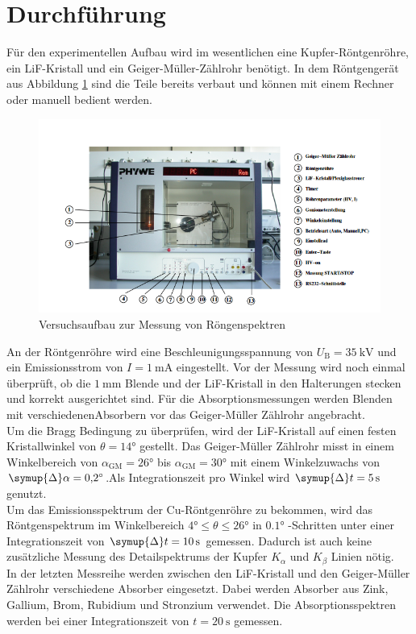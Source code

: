 \section{Durchführung}
Für den experimentellen Aufbau wird im wesentlichen eine Kupfer-Röntgenröhre, ein LiF-Kristall und ein Geiger-Müller-Zählrohr benötigt. In dem Röntgengerät aus Abbildung \ref{fig:aufbau}
sind die Teile bereits verbaut und können mit einem Rechner oder manuell bedient werden.
\begin{figure}
    \centering
    \caption{Versuchsaufbau zur Messung von Röngenspektren \cite{}}
    \label{fig:aufbau}
    \includegraphics[width = 0.6 \textwidth]{pics/gerät.png}
\end{figure}
An der Röntgenröhre wird eine Beschleunigungsspannung von $U_\text{B}=\SI{35}{\kilo \volt}$ und ein Emissionsstrom von $I=\SI{1}{\milli\ampere}$ eingestellt.
Vor der Messung wird noch einmal überprüft, ob die $\SI{1}{\milli\metre}$ Blende und der LiF-Kristall in den Halterungen stecken und korrekt ausgerichtet sind.
Für die Absorptionsmessungen werden Blenden mit verschiedenenAbsorbern vor das Geiger-Müller Zählrohr angebracht.
\\
Um die Bragg Bedingung zu überprüfen, wird der LiF-Kristall auf einen festen Kristallwinkel von $\theta=\ang{14;;}$ gestellt. Das Geiger-Müller Zählrohr misst in einem Winkelbereich von 
$\alpha_\text{GM}=\ang{26;;} $ bis $\alpha_\text{GM}=\ang{30;;} $ mit einem Winkelzuwachs von $\symup{\Delta} \alpha =\ang{0.2;;}$.Als Integrationszeit pro Winkel wird 
$\symup{\Delta}t=\SI{5}{\second}$ genutzt.
\\
Um das Emissionsspektrum der Cu-Röntgenröhre zu bekommen, wird das Röntgenspektrum im Winkelbereich $\ang{4;;} \leq \theta \leq \ang{26;;}$ in $\ang{0.1;;}$
-Schritten unter einer Integrationszeit von $\symup{\Delta}t=\SI{10}{\second}$ gemessen. Dadurch ist auch keine zusätzliche Messung des Detailspektrums der Kupfer $K_\alpha$
und $K_\beta$ Linien nötig.
\\
In der letzten Messreihe werden zwischen den LiF-Kristall und den Geiger-Müller Zählrohr verschiedene Absorber eingesetzt. Dabei werden Absorber aus Zink, Gallium, Brom, Rubidium und Stronzium verwendet.
Die Absorptionsspektren werden bei einer Integrationszeit von $t=\SI{20}{\second}$ gemessen.